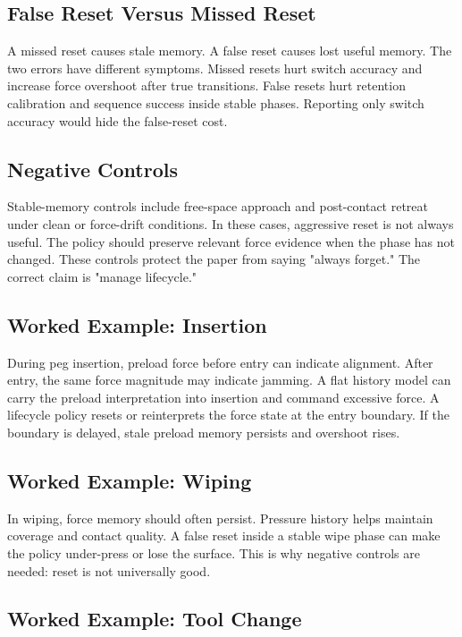 \documentclass{article}
\begin{document}
\subsection{False Reset Versus Missed Reset}

A missed reset causes stale memory. A false reset causes lost useful memory.
The two errors have different symptoms. Missed resets hurt switch accuracy and
increase force overshoot after true transitions. False resets hurt retention
calibration and sequence success inside stable phases. Reporting only switch
accuracy would hide the false-reset cost.

\subsection{Negative Controls}

Stable-memory controls include free-space approach and post-contact retreat
under clean or force-drift conditions. In these cases, aggressive reset is not
always useful. The policy should preserve relevant force evidence when the
phase has not changed. These controls protect the paper from saying "always
forget." The correct claim is "manage lifecycle."

\subsection{Worked Example: Insertion}

During peg insertion, preload force before entry can indicate alignment. After
entry, the same force magnitude may indicate jamming. A flat history model can
carry the preload interpretation into insertion and command excessive force. A
lifecycle policy resets or reinterprets the force state at the entry boundary.
If the boundary is delayed, stale preload memory persists and overshoot rises.

\subsection{Worked Example: Wiping}

In wiping, force memory should often persist. Pressure history helps maintain
coverage and contact quality. A false reset inside a stable wipe phase can make
the policy under-press or lose the surface. This is why negative controls are
needed: reset is not universally good.

\subsection{Worked Example: Tool Change}
\end{document}
